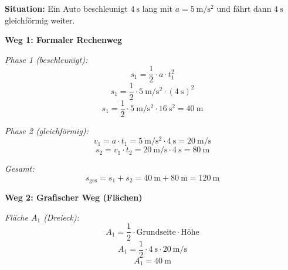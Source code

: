 \documentclass[11pt, a4paper]{article}
\begin{document}
\begin{beispielbox}[title=Beispiel: Weg aus $v$-$t$-Diagramm berechnen]
\textbf{Situation:} Ein Auto beschleunigt $\SI{4}{\second}$ lang mit $a = \SI{5}{\metre\per\second\squared}$ und fährt dann $\SI{4}{\second}$ gleichförmig weiter.

\begin{center}
\end{center}

\vspace{0.5em}

\begin{minipage}[t]{0.48\textwidth}
\textbf{Weg 1: Formaler Rechenweg}

\textit{Phase 1 (beschleunigt):}
$$s_1 = \dfrac{1}{2} \cdot a \cdot t_1^2$$
$$s_1 = \dfrac{1}{2} \cdot \SI{5}{\metre\per\second\squared} \cdot (\SI{4}{\second})^2$$
$$s_1 = \dfrac{1}{2} \cdot \SI{5}{\metre\per\second\squared} \cdot \SI{16}{\second\squared} = \SI{40}{\metre}$$

\textit{Phase 2 (gleichförmig):}
$$v_1 = a \cdot t_1 = \SI{5}{\metre\per\second\squared} \cdot \SI{4}{\second} = \SI{20}{\metre\per\second}$$
$$s_2 = v_1 \cdot t_2 = \SI{20}{\metre\per\second} \cdot \SI{4}{\second} = \SI{80}{\metre}$$

\textit{Gesamt:}
$$s_{\text{ges}} = s_1 + s_2 = \SI{40}{\metre} + \SI{80}{\metre} = \SI{120}{\metre}$$
\end{minipage}
\hfill
\begin{minipage}[t]{0.48\textwidth}
\textbf{Weg 2: Grafischer Weg (Flächen)}

\textit{Fläche $A_1$ (Dreieck):}
$$A_1 = \dfrac{1}{2} \cdot \text{Grundseite} \cdot \text{Höhe}$$
$$A_1 = \dfrac{1}{2} \cdot \SI{4}{\second} \cdot \SI{20}{\metre\per\second}$$
$$A_1 = \SI{40}{\metre}$$


\end{minipage}
\end{beispielbox}
\end{document}
